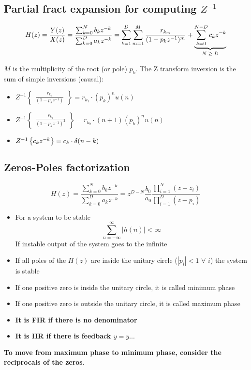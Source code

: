 \subsection{Partial fract expansion for computing $Z^{-1}$}
\begin{LARGE}
    $$
    H(z)=\frac{Y(z)}{X(z)}=\frac{\sum_{k=0}^Nb_kz^{-k}}{\sum_{k=0}^Da_kz^{-k}}
    =
    \sum_{k=1}^D\sum_{m=1}^M\frac{
        r_{k_m}
    }{(1-p_kz^{-1})^m}+
    \underlabel{
        \sum_{k=0}^{N-D}c_kz^{-k}
    }{$N\geq D$}
    $$
\end{LARGE}
$M$ is the multiplicity of the root (or pole) $p_k$. The Z transform inversion is the sum of simple inversions (causal):
\begin{itemize}
    \item $Z^{-1}\begin{Bmatrix}
        \frac{r_{k_1}}{(1-p_kz^{-1})}
    \end{Bmatrix}=r_{k_1}\cdot (p_k)^nu(n)$
    \item $Z^{-1}\begin{Bmatrix}
        \frac{r_{k_2}}{(1-p_kz^{-1})^2}
    \end{Bmatrix}=r_{k_2}\cdot (n+1)(p_k)^nu(n)$
    \item $Z^{-1}\Brackets{c_kz^{-k}}=c_k\cdot \delta(n-k)$
\end{itemize}

\subsection{Zeros-Poles factorization}
\begin{LARGE}
    $$
    H(z)=\frac{
        \sum_{k=0}^Nb_kz^{-k}
    }{\sum_{k=0}^Da_kz^{-k}}
    =z^{D-N}\frac{b_0}{a_0}\frac{
        \prod_{i=1}^N(z-z_i)
    }{\prod_{i=1}^D(z-p_i)}
    $$
\end{LARGE}
\begin{itemize}
    \item For a system to be stable
    $$
    \sum_{n=-\infty}^\infty|h(n)|<\infty
    $$
    If instable output of the system goes to the infinite
    \item If all poles of the $H(z)$ are inside the unitary circle ($|p_i|<1\,\,\forall\,\,i$) the system is stable
    \item If one positive zero is inside the unitary circle, it is called minimum phase
    \item If one positive zero is outside the unitary circle, it is called maximum phase
    \item \textbf{It is FIR if there is no denominator}
    \item \textbf{It is IIR if there is feedback $y=y...$}
\end{itemize}
\textbf{To move from maximum phase to minimum phase, consider the reciprocals of the zeros}.

